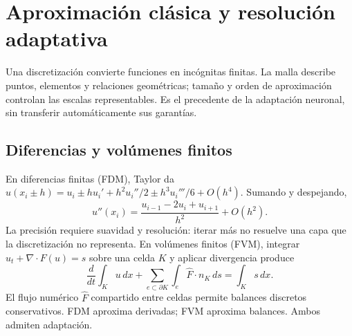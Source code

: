 \section{Aproximación clásica y resolución adaptativa}
Una discretización convierte funciones en incógnitas finitas. La malla describe puntos, elementos y relaciones geométricas; tamaño y orden de aproximación controlan las escalas representables. Es el precedente de la adaptación neuronal, sin transferir automáticamente sus garantías.

\subsection{Diferencias y volúmenes finitos}
En diferencias finitas (FDM), Taylor da $u(x_i\pm h)=u_i\pm hu_i'+h^2u_i''/2\pm h^3u_i'''/6+O(h^4)$. Sumando y despejando,
\begin{equation}u''(x_i)=\frac{u_{i-1}-2u_i+u_{i+1}}{h^2}+O(h^2).\end{equation}
La precisión requiere suavidad y resolución: iterar más no resuelve una capa que la discretización no representa. En volúmenes finitos (FVM), integrar $u_t+\nabla\cdot F(u)=s$ sobre una celda $K$ y aplicar divergencia produce
\begin{equation}\frac d{dt}\int_Ku\,dx+\sum_{e\subset\partial K}\int_e\widehat F\cdot n_K\,ds=\int_Ks\,dx.\end{equation}
El flujo numérico $\widehat F$ compartido entre celdas permite balances discretos conservativos. FDM aproxima derivadas; FVM aproxima balances. Ambos admiten adaptación.

